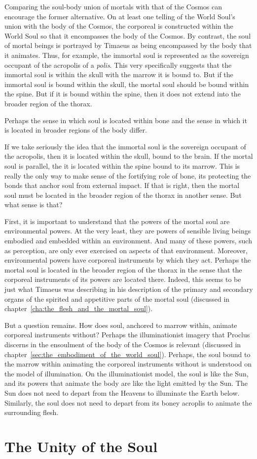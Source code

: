 Comparing the soul-body union of mortals with that of the Cosmos can encourage the former alternative. On at least one telling of the World Soul's union with the body of the Cosmos, the corporeal is constructed within the World Soul so that it encompasses the body of the Cosmos. By contrast, the soul of mortal beings is portrayed by Timaeus as being encompassed by the body that it animates. Thus, for example, the immortal soul is represented as the sovereign occupant of the acropolis of a \emph{polis}. This very specifically suggests that the immortal soul is within the skull with the marrow it is bound to. But if the immortal soul is bound within the skull, the mortal soul should be bound within the spine. But if it is bound within the spine, then it does not extend into the broader region of the thorax.

Perhaps the sense in which soul is located within bone and the sense in which it is located in broader regions of the body differ. 

If we take seriously the idea that the immortal soul is the sovereign occupant of the acropolis, then it is located within the skull, bound to the brain. If the mortal soul is parallel, the it is located within the spine bound to its marrow. This is really the only way to make sense of the fortifying role of bone, its protecting the bonds that anchor soul from external impact. If that is right, then the mortal soul must be located in the broader region of the thorax in another sense. But what sense is that?

First, it is important to understand that the powers of the mortal soul are environmental powers. At the very least, they are powers of sensible living beings embodied and embedded within an environment. And many of these powers, such as perception, are only ever exercised on aspects of that environment. Moreover, environmental powers have corporeal instruments by which they act. Perhaps the mortal soul is located in the broader region of the thorax in the sense that the corporeal instruments of its powers are located there. Indeed, this seems to be just what Timaeus was describing in his description of the primary and secondary organs of the spirited and appetitive parts of the mortal soul (discussed in chapter~\ref{cha:the_flesh_and_the_mortal_soul}).

But a question remains. How does soul, anchored to marrow within, animate corporeal instruments without? Perhaps the illuminationist imagery that Proclus discerns in the ensoulment of the body of the Cosmos is relevant (discussed in chapter~\ref{sec:the_embodiment_of_the_world_soul}). Perhaps, the soul bound to the marrow within animating the corporeal instruments without is understood on the model of illumination. On the illuminationist model, the soul is like the Sun, and its powers that animate the body are like the light emitted by the Sun. The Sun does not need to depart from the Heavens to illuminate the Earth below. Similarly, the soul does not need to depart from its boney acroplis to animate the surrounding flesh.


\section{The Unity of the Soul} %
\label{sec:the_unity_of_the_soul}


